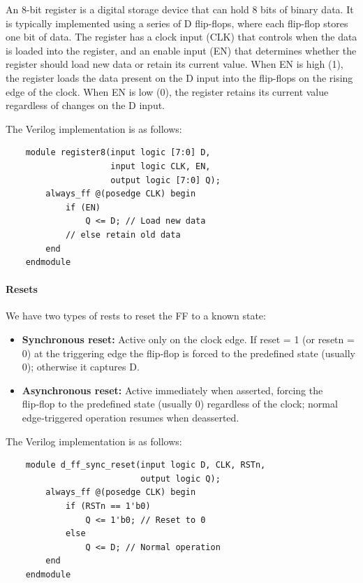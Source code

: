 \documentclass[11pt]{report}
\begin{document}
\begin{definition}
    An 8-bit register is a digital storage device that can hold 8 bits of binary data. It is typically implemented using a series of D flip-flops, where each flip-flop stores one bit of data. The register has a clock input (CLK) that controls when the data is loaded into the register, and an enable input (EN) that determines whether the register should load new data or retain its current value. When EN is high (1), the register loads the data present on the D input into the flip-flops on the rising edge of the clock. When EN is low (0), the register retains its current value regardless of changes on the D input.

    The Verilog implementation is as follows:
    \begin{verbatim}
    module register8(input logic [7:0] D,
                     input logic CLK, EN,
                     output logic [7:0] Q);
        always_ff @(posedge CLK) begin
            if (EN)
                Q <= D; // Load new data
            // else retain old data
        end
    endmodule
    \end{verbatim}
    
\end{definition}

\paragraph{Resets} We have two types of rests to reset the FF to a known state:
\begin{itemize}
    \item \textbf{Synchronous reset:} Active only on the clock edge. If reset = 1 (or resetn = 0) at the triggering edge the flip‑flop is forced to the predefined state (usually 0); otherwise it captures D.
    \item \textbf{Asynchronous reset:} Active immediately when asserted, forcing the flip‑flop to the predefined state (usually 0) regardless of the clock; normal edge‑triggered operation resumes when deasserted.
\end{itemize}
\begin{definition}
    The Verilog implementation is as follows:
    \begin{verbatim}
    module d_ff_sync_reset(input logic D, CLK, RSTn,
                           output logic Q);
        always_ff @(posedge CLK) begin
            if (RSTn == 1'b0)
                Q <= 1'b0; // Reset to 0
            else
                Q <= D; // Normal operation
        end
    endmodule
    \end{verbatim}
    
\end{definition}
\end{document}
